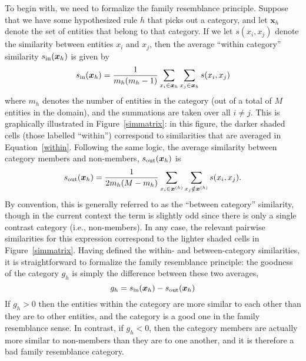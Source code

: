\documentclass{apa}
\begin{document}
To begin with, we need to formalize the family resemblance principle. Suppose that we have some hypothesized rule $h$ that picks out a category, and let $\bm{x}_h$ denote the set of entities that belong to that category. If we let $s(x_i, x_j)$ denote the similarity between entities $x_i$ and $x_j$, then the average ``within category'' similarity $s_{\rm in}(\bm{x}_h)$ is given by
\begin{equation}
s_{\rm in}(\bm{x}_h) = \frac{1}{m_h(m_h-1)}\sum_{x_i \in \bm{x}_h}  \sum_{x_j \in \bm{x}_h} s(x_i,x_j) \label{within}
\end{equation}
where $m_h$ denotes the number of entities in the category (out of a total of $M$ entities in the domain), and the summations are taken over all $i \neq j$. This is graphically illustrated in Figure~\ref{simmatrix}: in this figure, the darker shaded cells (those labelled ``within'') correspond to similarities that are averaged in Equation~\ref{within}. Following the same logic, the average similarity between category members and non-members, $s_{\rm out}(\bm{x}_h)$ is
\begin{equation}
s_{\rm out}(\bm{x}_h) = \frac{1}{2m_h (M-m_h)} \sum_{x_i \in \bm{x}^{(h)}} \sum_{x_j \notin \bm{x}^{(h)}} s(x_i,x_j).
\end{equation}
By convention, this is generally referred to as the ``between category'' similarity, though in the current context the term is slightly odd since there is only a single contrast category (i.e., non-members). In any case, the relevant pairwise similarities  for this expression correspond to the lighter shaded cells in Figure~\ref{simmatrix}. Having defined the within- and between-category similarities, it is straightforward to formalize the family resemblance principle: the goodness of the category $g_h$ is simply the difference between these two averages,
\begin{equation}
g_h = s_{\rm in}(\bm{x}_h) - s_{\rm out}(\bm{x}_h)
\end{equation}
If $g_h>0$ then the entities within the category are more similar to each other than they are to other entities, and the category is a good one in the family resemblance sense. In contrast, if $g_h<0$, then the category members are actually more similar to non-members than they are to one another, and it is therefore a bad family resemblance category.
\end{document}

